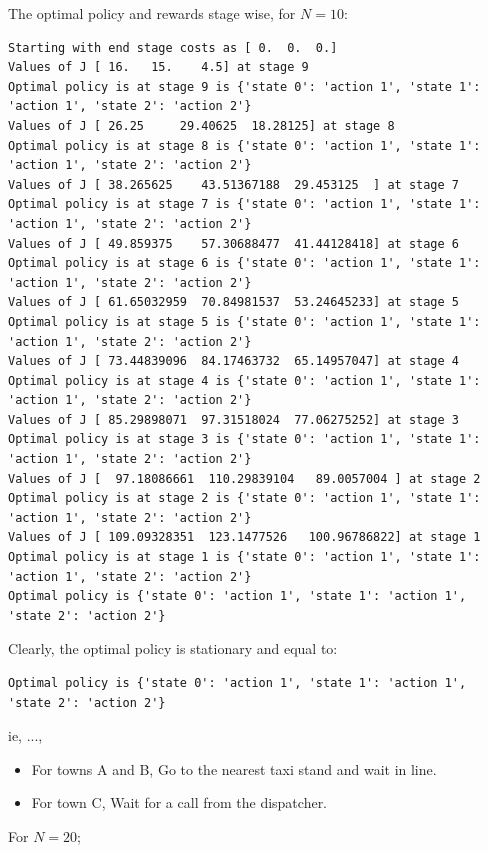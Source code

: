 The optimal policy and rewards stage wise, for $N=10$:

\begin{lstlisting}[numbers = none]
Starting with end stage costs as [ 0.  0.  0.]
Values of J [ 16.   15.    4.5] at stage 9
Optimal policy is at stage 9 is {'state 0': 'action 1', 'state 1': 'action 1', 'state 2': 'action 2'}
Values of J [ 26.25     29.40625  18.28125] at stage 8
Optimal policy is at stage 8 is {'state 0': 'action 1', 'state 1': 'action 1', 'state 2': 'action 2'}
Values of J [ 38.265625    43.51367188  29.453125  ] at stage 7
Optimal policy is at stage 7 is {'state 0': 'action 1', 'state 1': 'action 1', 'state 2': 'action 2'}
Values of J [ 49.859375    57.30688477  41.44128418] at stage 6
Optimal policy is at stage 6 is {'state 0': 'action 1', 'state 1': 'action 1', 'state 2': 'action 2'}
Values of J [ 61.65032959  70.84981537  53.24645233] at stage 5
Optimal policy is at stage 5 is {'state 0': 'action 1', 'state 1': 'action 1', 'state 2': 'action 2'}
Values of J [ 73.44839096  84.17463732  65.14957047] at stage 4
Optimal policy is at stage 4 is {'state 0': 'action 1', 'state 1': 'action 1', 'state 2': 'action 2'}
Values of J [ 85.29898071  97.31518024  77.06275252] at stage 3
Optimal policy is at stage 3 is {'state 0': 'action 1', 'state 1': 'action 1', 'state 2': 'action 2'}
Values of J [  97.18086661  110.29839104   89.0057004 ] at stage 2
Optimal policy is at stage 2 is {'state 0': 'action 1', 'state 1': 'action 1', 'state 2': 'action 2'}
Values of J [ 109.09328351  123.1477526   100.96786822] at stage 1
Optimal policy is at stage 1 is {'state 0': 'action 1', 'state 1': 'action 1', 'state 2': 'action 2'}
Optimal policy is {'state 0': 'action 1', 'state 1': 'action 1', 'state 2': 'action 2'}
\end{lstlisting}

Clearly, the optimal policy is stationary and equal to:
\begin{lstlisting}[numbers = none]
Optimal policy is {'state 0': 'action 1', 'state 1': 'action 1', 'state 2': 'action 2'}
\end{lstlisting}

ie, ...,

\begin{itemize}
\item For towns A and B, Go to the nearest taxi stand and wait in line.
\item For town C, Wait for a call from the dispatcher.
\end{itemize}

For $N=20$;

